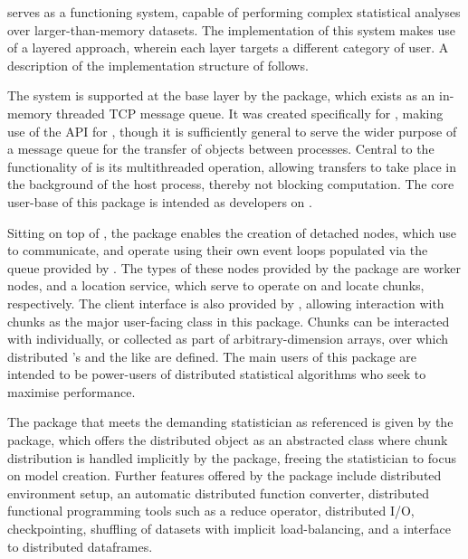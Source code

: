 \lsr{} serves as a functioning system, capable of performing complex statistical analyses over larger-than-memory datasets.
The implementation of this system makes use of a layered approach, wherein each layer targets a different category of user.
A description of the implementation structure of \lsr{} follows.

The system is supported at the base layer by the  package, which exists as an in-memory threaded TCP message queue.
It was created specifically for , making use of the  API for \R{}, though it is sufficiently general to serve the wider purpose of a message queue for the transfer of \R{} objects between \R{} processes.
Central to the functionality of  is its multithreaded operation, allowing transfers to take place in the background of the host \R{} process, thereby not blocking computation.
The core user-base of this package is intended as developers on \lsr{}.

Sitting on top of , the package  enables the creation of detached nodes, which use  to communicate, and operate using their own event loops populated via the queue provided by .
The types of these nodes provided by the package are worker nodes, and a location service, which serve to operate on and locate chunks, respectively.
The client interface is also provided by , allowing interaction with chunks as the major user-facing class in this package.
Chunks can be interacted with individually, or collected as part of arbitrary-dimension arrays, over which distributed 's and the like are defined.
The main users of this package are intended to be power-users of distributed statistical algorithms who seek to maximise performance.

The package that meets the demanding statistician as referenced is given by the \lsr{} package, which offers the distributed object as an abstracted class where chunk distribution is handled implicitly by the package, freeing the statistician to focus on model creation.
Further features offered by the package include distributed environment setup, an automatic distributed function converter, distributed functional programming tools such as a reduce operator, distributed I/O, checkpointing, shuffling of datasets with implicit load-balancing, and a  interface to distributed dataframes\cite{dplyr}.
